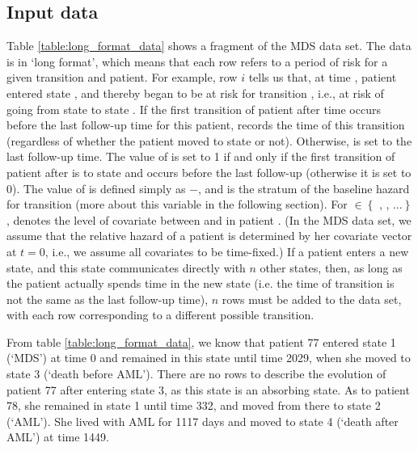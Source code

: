 \subsection{Input data}
Table \ref{table:long_format_data} shows a fragment of the MDS data set. The data is in `long format', which means that each row refers to a period of risk for a given transition and patient. 
For example, row $i$ tells us that, at time , patient  entered state , and thereby began to be at risk  for transition , i.e., at risk of going from state  to state . If the first transition of  patient  after time    occurs  before the last follow-up time for this patient,  records the time of this transition (regardless of whether the patient moved to state  or not). Otherwise,  is set to the last follow-up time. The value of   is set to 1 if and only if the first transition of patient   after  is to state  and occurs before the last follow-up (otherwise it is set to 0). 
The value of   is defined simply as $ - $, and  is the stratum of the baseline hazard for transition  (more about this variable in the following section). For  $\in \left\lbrace \right.$ , , $\dots \left. \right \rbrace $,   denotes the level of covariate  between  and  in patient . (In the MDS data set, we assume that the relative hazard of a patient is determined by her covariate vector at $t=0$, i.e., we assume all covariates to be time-fixed.) 
If a patient enters a new state, and this state communicates directly with $n$ other states, then, as long as the patient actually spends time in the new state (i.e. the time of transition is not the same as the last follow-up time), $n$ rows must be added to the data set, with each row corresponding to a different possible transition.

From table \ref{table:long_format_data}, we know that patient 77 entered state 1 (`MDS') at time 0 and remained in this state until time 2029, when she moved to state 3 (`death before AML'). There are no rows to describe the evolution of patient 77 after entering state 3, as this state is an absorbing state. As to patient 78, she remained in state 1 until time 332, and moved from there to state 2 (`AML'). She lived with AML for 1117 days and moved to state 4 (`death after AML') at time 1449.


